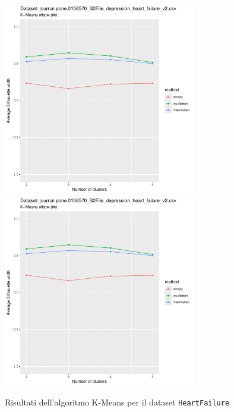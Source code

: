 \documentclass[a4paper, 12pt]{report}
\begin{document}
			\begin{figure}[H]
				\centering
				\includegraphics[width = 0.75\textwidth, height = 0.45\textheight, page = 1]{
					results/results_HeartFailure.csv.pdf
				}
				\includegraphics[width = 0.75\textwidth, height = 0.45\textheight, page = 2]{
					results/results_HeartFailure.csv.pdf
				}
				\caption{Risultati dell'algoritmo K-Means per il dataset
				\texttt{HeartFailure}}
				\label{fig:kmeans1}
			\end{figure}
\end{document}
